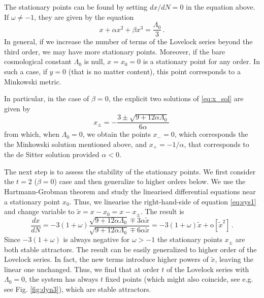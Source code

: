 \documentclass[aps,prd,preprint,nofootinbib]{revtex4-1}
\begin{document}
The stationary points can be found by setting $dx/dN=0$ in the equation above. If $\omega\neq -1$, they are given by the equation
\begin{equation}
x+\alpha x^2+\beta x^3 = \frac{\Lambda_0}{3}\,.\label{eq:x_sol}
\end{equation}
In general, if we increase the number of terms of the Lovelock series beyond the third order, we may have more stationary points. Moreover, if  the bare cosmological constant $\Lambda_0$ is null, $x=x_0=0$ is a stationary point for any order. In such a case, if $y=0$ (that is no matter content), this point corresponds to a Minkowski metric.

In particular, in the case of $\beta=0$, the explicit two solutions of \eqref{eq:x_sol} are given by
\begin{equation}
x_{\pm} = -\frac{3 \pm \sqrt{9+12\alpha\Lambda_0}}{6 \alpha}\,\label{eq:sp_a1}
\end{equation}
from which, when $\Lambda_0 = 0$, we obtain the points $x_-=0$, which corresponds the the Minkowski solution mentioned above, and $x_+=-1/\alpha$, that corresponds to the de Sitter solution provided $\alpha<0$. 

The next step is to assess the stability of the stationary points. We first consider the $t=2$ ($\beta=0$) case and then generalize to higher orders below. We use the Hartmann-Grobman theorem and study the linearised differential equations near a stationary point $x_0$. Thus, we linearise the right-hand-side of equation \eqref{eq:sys1} and change variable to $\tilde{x} = x - x_0 = x - x_{\pm}$. The result is
\begin{equation}
\frac{dx}{dN} =-3(1+\omega) \frac{\sqrt{9+12\alpha\Lambda_0} \mp 3 \alpha \tilde{x}}{\sqrt{9+12\alpha\Lambda_0} \mp 6 \alpha \tilde{x}} = -3(1+\omega) \tilde{x} + \text{o}[ \tilde{x}^2]\,.\label{eq:dyn_lin}
\end{equation}
Since $-3(1+\omega)$ is always negative for $\omega>-1$  the stationary points $x_\pm$ are both stable attractors. The result can be easily generalized to higher order of the Lovelock series. In fact, the new terms introduce higher powers of $\tilde{x}$, leaving the linear one unchanged. Thus, we find that at order $t$ of the Lovelock series with $\Lambda_0=0$, the system has always $t$ fixed points (which might also coincide, see e.g. see Fig. \ref{fig:dyn3}), which are stable attractors.
\end{document}
